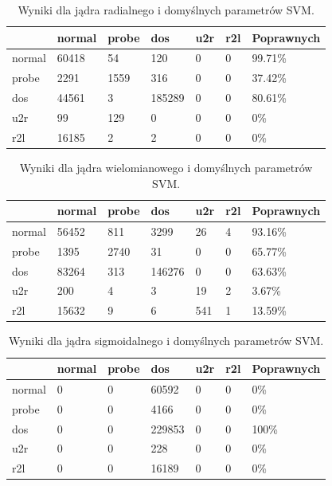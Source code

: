 \documentclass[a4paper, 12pt]{article}
\begin{document}
\begin{table}[H]
\centering
\begin{tabular}{ | l | l | l | l | l | l | l | } \hline
	& normal &  probe &   dos  &  u2r  & r2l 	& Poprawnych	\\ \hline
  normal  & 60418  &  54   &  120   &  0 &  0 & 99.71\% \\ \hline
  probe   & 2291   &  1559 &   316  &  0 &  0 & 37.42\% \\ \hline
  dos     & 44561  &    3  & 185289 &  0 &  0 & 80.61\% \\ \hline
  u2r     &    99  & 129   &   0 &   0 &  0 & 0\% \\ \hline
  r2l     & 16185  &    2  &    2 &  0 &  0 & 0\% \\ \hline
\end{tabular} 
\caption{Wyniki dla jądra radialnego i domyślnych parametrów SVM.}
\label{table:cm_svm_radial_default}
\end{table}

\begin{table}[H]
\centering
\begin{tabular}{ | l | l | l | l | l | l | l | } \hline
	& normal &  probe &   dos  &  u2r  & r2l 	& Poprawnych	\\ \hline
  normal & 56452 &  811 &  3299 & 26 &  4 & 93.16\% \\ \hline
  probe  &  1395 & 2740 &    31 &  0 &  0 & 65.77\% \\ \hline
  dos    & 83264 &  313 & 146276 &  0 &  0 & 63.63\% \\ \hline
  u2r    &   200 &   4  &  3  & 19  & 2 & 3.67\% \\ \hline
  r2l    & 15632 &    9 &  6  & 541 &  1 & 13.59\% \\ \hline
\end{tabular} 
\caption{Wyniki dla jądra wielomianowego i domyślnych parametrów SVM.}
\label{table:cm_svm_poly_default}
\end{table}

\begin{table}[H]
\centering
\begin{tabular}{ | l | l | l | l | l | l | l | } \hline
	& normal &  probe &   dos  &  u2r  & r2l 	& Poprawnych	\\ \hline
  normal   &   0  &   0 & 60592  &  0  &  0 & 0\% \\ \hline
  probe    &   0  &   0 &  4166  &  0  &  0 & 0\% \\ \hline
  dos      &   0  &   0 & 229853 &  0  &  0 & 100\% \\ \hline
  u2r      &   0  &   0 &   228  &  0  &  0 & 0\% \\ \hline
  r2l      &   0  &   0 & 16189  &  0  &  0 & 0\% \\ \hline
\end{tabular} 
\caption{Wyniki dla jądra sigmoidalnego i domyślnych parametrów SVM.}
\label{table:cm_svm_sigmoid_default}
\end{table}
\end{document}
